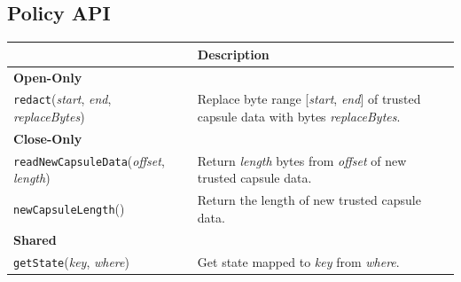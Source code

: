 \subsection{Policy API}
\label{subsec:policy}

\begin{table}[t]
    \begin{center}
        \small{
            \begin{tabular}{l|l}
                \hline
                                    & \textbf{Description}                                                                               \\\hline\hline
                \textbf{Open-Only}  &                                                                                                    \\\hline\hline

                {\tt redact}({\em start}, {\em end}, {\em replaceBytes})
                                    & Replace byte range [{\em start}, {\em end}] of trusted capsule data with bytes {\em replaceBytes}. \\\hline

                \textbf{Close-Only} &                                                                                                    \\\hline\hline

                {\tt readNewCapsuleData}({\em offset}, {\em length})
                                    & Return {\em length} bytes from {\em offset} of new trusted capsule data.                           \\\hline

                {\tt newCapsuleLength}()
                                    & Return the length of new trusted capsule data.                                                     \\\hline

                \textbf{Shared}     &                                                                                                    \\\hline\hline

                {\tt getState}({\em key}, {\em where})
                                    & Get state mapped to {\em key} from {\em where}.                                                    \\\hline


\end{tabular}}
\end{center}
\end{table}

